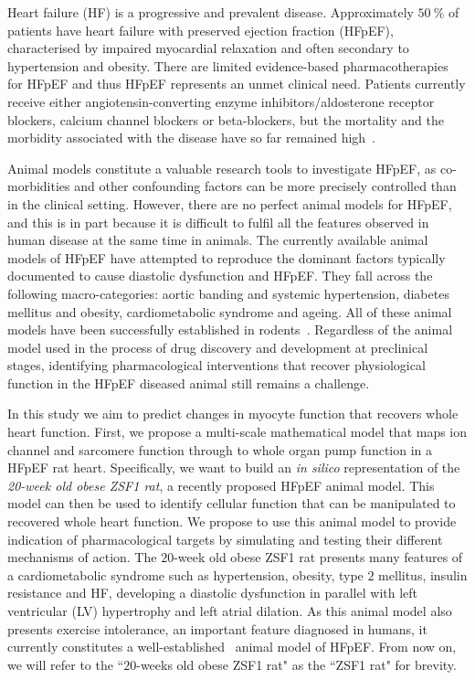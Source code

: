 \vspace{0.2cm}\noindent
{}

\noindent
Heart failure (HF) is a progressive and prevalent disease. Approximately $\SI{50}{\percent}$ of patients have heart failure with preserved ejection fraction (HFpEF), characterised by impaired myocardial relaxation and often secondary to hypertension and obesity. There are limited evidence-based pharmacotherapies for HFpEF and thus HFpEF represents an unmet clinical need. Patients currently receive either angiotensin-converting enzyme inhibitors/aldosterone receptor blockers, calcium channel blockers or beta-blockers, but the mortality and the morbidity associated with the disease have so far remained high~\cite{Adamczak:2020}.

\vspace{0.2cm}
Animal models constitute a valuable research tools to investigate HFpEF, as co-morbidities and other confounding factors can be more precisely controlled than in the clinical setting. However, there are no perfect animal models for HFpEF, and this is in part because it is difficult to fulfil all the features observed in human disease at the same time in animals. The currently available animal models of HFpEF have attempted to reproduce the dominant factors typically documented to cause diastolic dysfunction and HFpEF. They fall across the following macro-categories: aortic banding and systemic hypertension, diabetes mellitus and obesity, cardiometabolic syndrome and ageing. All of these animal models have been successfully established in rodents~\cite{Conceicao:2016}. Regardless of the animal model used in the process of drug discovery and development at preclinical stages, identifying pharmacological interventions that recover physiological function in the HFpEF diseased animal still remains a challenge.

\vspace{0.2cm}
In this study we aim to predict changes in myocyte function that recovers whole heart function. First, we propose a multi-scale mathematical model that maps ion channel and sarcomere function through to whole organ pump function in a HFpEF rat heart. Specifically, we want to build an \textit{in silico} representation of the \textit{20-week old obese ZSF1 rat}, a recently proposed HFpEF animal model. This model can then be used to identify cellular function that can be manipulated to recovered whole heart function. We propose to use this animal model to provide indication of pharmacological targets by simulating and testing their different mechanisms of action. The $20$-week old obese ZSF1 rat presents many features of a cardiometabolic syndrome such as hypertension, obesity, type $2$ mellitus, insulin resistance and HF, developing a diastolic dysfunction in parallel with left ventricular (LV) hypertrophy and left atrial dilation. As this animal model also presents exercise intolerance, an important feature diagnosed in humans, it currently constitutes a well-established~\cite{Conceicao:2016} animal model of HFpEF. From now on, we will refer to the ``$20$-weeks old obese ZSF1 rat" as the ``ZSF1 rat" for brevity.


